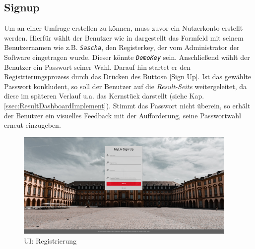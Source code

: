 
\subsection{Signup}
\label{ssec:Signup}

Um an einer Umfrage erstellen zu können, muss zuvor ein Nutzerkonto erstellt werden. 
Hierfür wählt der Benutzer wie in \abb {} dargestellt das Formfeld mit seinem Benutzernamen wie z.B. \emph{\texttt{Sascha}}, den Registerkey, der vom Administrator der Software eingetragen wurde. Dieser könnte \emph{\texttt{DemoKey}} sein.
Anschließend wählt der Benutzer ein Passwort seiner Wahl.
Darauf hin startet er den Registrierungsprozess durch das Drücken des Buttosn \jinline|Sign Up|.
Ist das gewählte Passwort konkludent, so soll der Benutzer auf die \emph{Result-Seite} weitergeleitet, da diese im späteren Verlauf u.a. das Kernstück darstellt (siehe Kap. \vref{ssec:ResultDashboardImplement}). 
Stimmt das Passwort nicht überein, so erhält der Benutzer ein visuelles Feedback mit der Aufforderung, seine Passwortwahl erneut einzugeben. 

\begin{figure}[hp]
	\centering
	\includegraphics[width=0.95\textwidth, keepaspectratio]{img/client/Signup.png}
	\captionsetup{justification=centering, format=plain}
	\caption[\acf{UI}: Registrierung]{\acf{UI}: Registrierung \\ \quelleScreenshot}
	\label{fig:SignupImplement}
\end{figure}